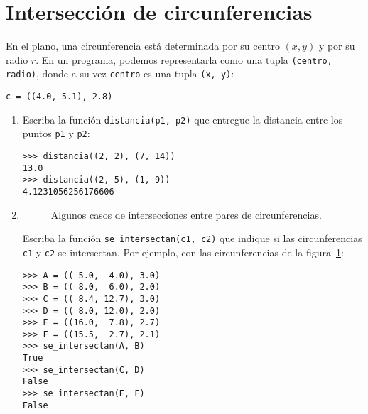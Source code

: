 \section{Intersección de circunferencias}

En el plano, una circunferencia está determinada por su centro
\((x, y)\) y por su radio \(r\).
En un programa, podemos representarla como una tupla
\lstinline!(centro, radio)!, donde a su vez \lstinline!centro! es una
tupla \lstinline!(x, y)!:
\begin{lstlisting}
c = ((4.0, 5.1), 2.8)
\end{lstlisting}

\begin{enumerate}

  \item
    Escriba la función \lstinline!distancia(p1, p2)! que entregue la
    distancia entre los puntos \lstinline!p1! y \lstinline!p2!:
\begin{lstlisting}
>>> distancia((2, 2), (7, 14))
13.0
>>> distancia((2, 5), (1, 9))
4.1231056256176606
\end{lstlisting}

  \item

    \begin{figure}
      \centering
      
      \caption{Algunos casos de intersecciones
        entre pares de circunferencias.}
      \label{fig:circunferencias}
    \end{figure}

    Escriba la función \lstinline!se_intersectan(c1, c2)! que indique si
    las circunferencias \lstinline!c1! y \lstinline!c2! se intersectan.
    Por ejemplo,
    con las circunferencias de la figura~\ref{fig:circunferencias}:
\begin{lstlisting}
>>> A = (( 5.0,  4.0), 3.0)
>>> B = (( 8.0,  6.0), 2.0)
>>> C = (( 8.4, 12.7), 3.0)
>>> D = (( 8.0, 12.0), 2.0)
>>> E = ((16.0,  7.8), 2.7)
>>> F = ((15.5,  2.7), 2.1)
>>> se_intersectan(A, B)
True
>>> se_intersectan(C, D)
False
>>> se_intersectan(E, F)
False
\end{lstlisting}
\end{enumerate}
